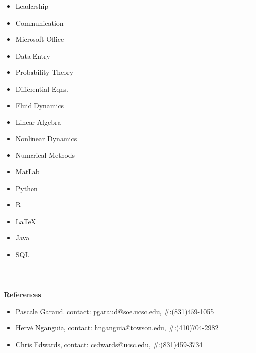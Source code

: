 \documentclass{article}
\begin{document}
\begin{footnotesize}
\begin{minipage}{.24\textwidth}
    \begin{itemize}[label = \tiny\textcolor{bullets}{}, leftmargin = 3pt]
        \item{Leadership}
        \item{Communication}
        \item{Microsoft Office}
        \item{Data Entry}
    \end{itemize}
\end{minipage}
\begin{minipage}{.24\textwidth}
    \begin{itemize}[label = \tiny\textcolor{bullets}{}, leftmargin = 1pt]
        \item{Probability Theory}
        \item{Differential Eqns.}
        \item{Fluid Dynamics}
        \item{Linear Algebra}
    \end{itemize}
\end{minipage}
\begin{minipage}{.24\textwidth}
    \begin{itemize}[label = \tiny\textcolor{bullets}{}, leftmargin = 3pt]
        \item{Nonlinear Dynamics}
        \item{Numerical Methods}
        \item{MatLab}
        \item{Python}
    \end{itemize}
\end{minipage}
\begin{minipage}{.24\textwidth}
    \begin{itemize}[label = \tiny\textcolor{bullets}{},leftmargin = 6pt]
        \item{R}
        \item{\LaTeX}
        \item{Java}
        \item{SQL}
    \end{itemize}
\end{minipage}
\end{footnotesize}
\\
\noindent\textcolor{lines}{\rule{\textwidth}{1pt}}\par
\vspace{10pt}
\bf{\Large References}
\vspace{3pt}
\begin{small}
\begin{itemize}[label = \textcolor{bullets}{}]
    \item{Pascale Garaud, contact: pgaraud@soe.ucsc.edu, \#:(831)459-1055}
    \item{Herv\'e Nganguia, contact: hnganguia@towson.edu, \#:(410)704-2982}
    \item{Chris Edwards, contact: cedwards@ucsc.edu, \#:(831)459-3734}
\end{itemize}
\end{small}
\end{document}
